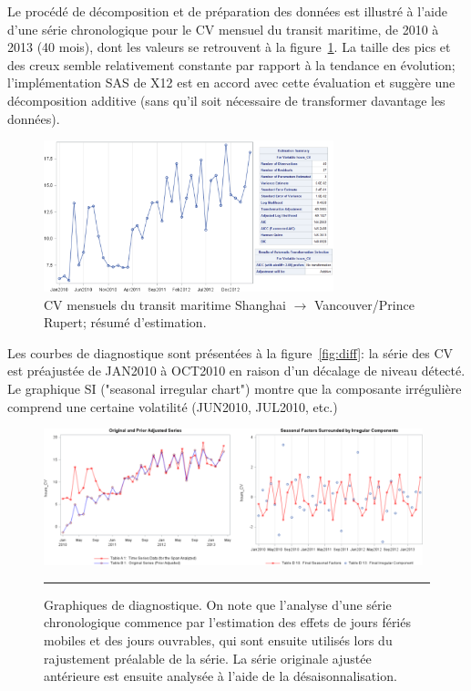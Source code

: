 \begin{Exemple}
Le proc\'ed\'e de décomposition et de préparation des données est illustré \`a l'aide d'une série chronologique  pour le CV mensuel du transit maritime, de 2010 à 2013 (40 mois), dont les valeurs se retrouvent à la figure~\ref{fig:cv_cont}. La taille des pics et des creux semble relativement constante par rapport à la tendance en \'evolution; l'implémentation SAS de X12  est en accord avec cette évaluation et suggère une décomposition additive (sans qu'il soit nécessaire de transformer davantage les données).
\begin{figure}[t]
\centering
\includegraphics[width=0.75\textwidth]{Images/CV_continuously.png}
\caption{\small CV mensuels du transit maritime Shanghai $\to$ Vancouver/Prince Rupert; r\'esum\'e d'estimation.}
\label{fig:cv_cont}
\end{figure}
\par Les courbes de diagnostique sont présentées \`a la figure~\ref{fig:diff}: la série des CV est préajustée de JAN2010 à OCT2010 en raison d'un décalage de niveau d\'etect\'e. Le graphique SI ("seasonal irregular chart") montre que la composante irr\'eguli\`ere comprend une certaine volatilit\'e (JUN2010, JUL2010, etc.)
\begin{figure}[t]
\centering
\includegraphics[width=0.98\textwidth]{Images/DiffComponents.png}
\caption{\small Graphiques de diagnostique. On note que l'analyse d'une série chronologique commence par l'estimation des effets de jours f\'eri\'es mobiles et des jours ouvrables, qui sont ensuite utilisés lors du rajustement préalable de la série. La série originale ajustée antérieure est ensuite analysée à l'aide de la désaisonnalisation.}\hrule

\end{figure}
\end{Exemple}
